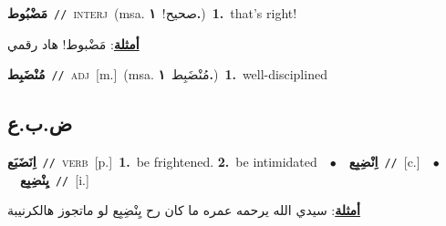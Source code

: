 \documentclass[10pt,a4paper,twoside]{article} %
\begin{document}
\begin{multicols}{2}
{\setlength\topsep{0pt}\textbf{\foreignlanguage{arabic}{مَضْبُوط}}\ {\color{gray}\texttt{//}\color{black}}\ \textsc{interj}\ \color{gray}(msa. \foreignlanguage{arabic}{صحيح!}~\foreignlanguage{arabic}{\textbf{١.}})\color{black}\ \textbf{1.}~that's right!\  \begin{flushright}\color{gray}\foreignlanguage{arabic}{\textbf{\underline{\foreignlanguage{arabic}{أمثلة}}}: مَضْبوط! هاد رقمي}\end{flushright}\color{black}} \vspace{2mm}

{\setlength\topsep{0pt}\textbf{\foreignlanguage{arabic}{مُنْضَبِط}}\ {\color{gray}\texttt{//}\color{black}}\ \textsc{adj}\ [m.]\ \color{gray}(msa. \foreignlanguage{arabic}{مُنْضَبِط}~\foreignlanguage{arabic}{\textbf{١.}})\color{black}\ \textbf{1.}~well-disciplined\ } \vspace{2mm}

\vspace{-3mm}
\subsection*{\color{blue}\foreignlanguage{arabic}{ض.ب.ع}\color{blue}{}} 

{\setlength\topsep{0pt}\textbf{\foreignlanguage{arabic}{اِنَضَبَع}}\ {\color{gray}\texttt{//}\color{black}}\ \textsc{verb}\ [p.]\ \textbf{1.}~be frightened.  \textbf{2.}~be intimidated\ \ $\bullet$\ \ \setlength\topsep{0pt}\textbf{\foreignlanguage{arabic}{اِنْضِبِع}}\ {\color{gray}\texttt{//}\color{black}}\ [c.]\ \ $\bullet$\ \ \setlength\topsep{0pt}\textbf{\foreignlanguage{arabic}{يِنْضِبِع}}\ {\color{gray}\texttt{//}\color{black}}\ [i.]\  \begin{flushright}\color{gray}\foreignlanguage{arabic}{\textbf{\underline{\foreignlanguage{arabic}{أمثلة}}}: سيدي الله يرحمه عمره ما كان رح يِنْضِبِع لو ماتجوز هالكرنيبة}\end{flushright}\color{black}} \vspace{2mm}


\end{multicols}
\end{document}
